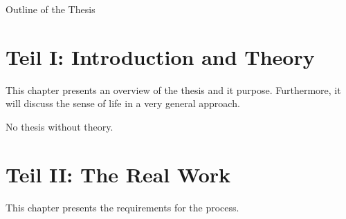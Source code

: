 \clearemptydoublepage

{}

\begin{center}
	\huge{Outline of the Thesis}
\end{center}




\section*{Teil I: Introduction and Theory}

  \vspace{1mm}

\noindent  This chapter presents an overview of the thesis and it purpose. Furthermore, it will discuss the sense of life in a very general approach.  \\

  \vspace{1mm}

\noindent  No thesis without theory.   \\

\section*{Teil II: The Real Work}

  \vspace{1mm}

\noindent  This chapter presents the requirements for the process.
